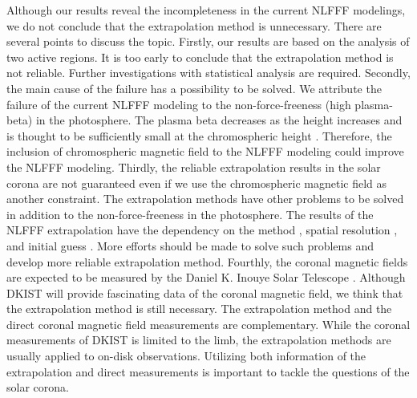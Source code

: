 \documentclass[manuscript]{aastex61}
\begin{document}
  Although our results reveal the incompleteness in the current NLFFF modelings,  we do not conclude that the extrapolation method is unnecessary.  
 There are several points to discuss the topic. 
Firstly, our results are based on the analysis of two active regions. 
It is too early to conclude that the extrapolation method is not reliable. 
Further investigations with statistical analysis are required. 
Secondly, the main cause of the failure has a possibility to be solved. 
We attribute the failure of the current NLFFF modeling to the non-force-freeness (high plasma-beta) in the photosphere. 
The plasma beta decreases as the height increases and is thought to be sufficiently small at the chromospheric height \citep{2001SoPh..203...71G}. 
Therefore, the inclusion of chromospheric magnetic field to the NLFFF modeling could improve the NLFFF modeling. 
Thirdly, the reliable extrapolation results in the solar corona are not guaranteed even if we use the chromospheric magnetic field as another constraint. 
The extrapolation methods have other problems to be solved in addition to the non-force-freeness in the photosphere. 
The results of the NLFFF extrapolation have the dependency on the method \citep{2009ApJ...696.1780D}, spatial resolution \citep{2015ApJ...811..107D}, and initial guess \citep{2020arXiv200500177K}. More efforts should be made to solve such problems and develop more reliable extrapolation method. 
Fourthly, the coronal magnetic fields are expected to be measured by the Daniel K. Inouye Solar Telescope \citep[DKIST:][]{2011ASPC..437..319K}. 
Although DKIST will provide fascinating data of the coronal magnetic field, we think that the extrapolation method is still necessary. The extrapolation method and the direct coronal magnetic field measurements are complementary. While the coronal measurements of DKIST is limited to the limb, the extrapolation methods are usually applied to on-disk observations. Utilizing both information of the extrapolation and direct measurements is important to tackle the questions of the solar corona. 
\end{document}
